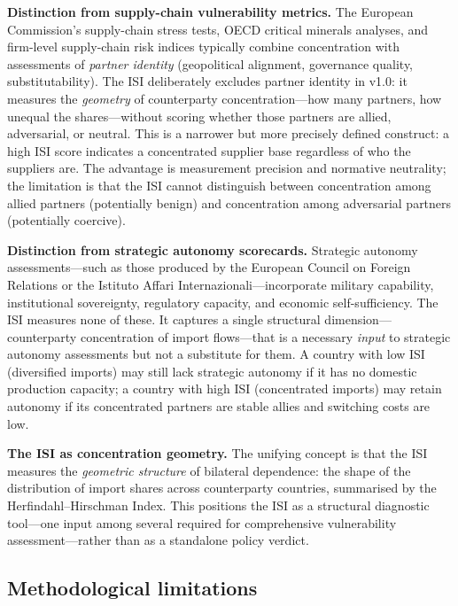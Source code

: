 \textbf{Distinction from supply-chain vulnerability metrics.}  The
European Commission's supply-chain stress tests, OECD critical
minerals analyses, and firm-level supply-chain risk indices typically
combine concentration with assessments of \emph{partner identity}
(geopolitical alignment, governance quality, substitutability).  The
ISI deliberately excludes partner identity in v1.0: it measures the
\emph{geometry} of counterparty concentration---how many partners,
how unequal the shares---without scoring whether those partners are
allied, adversarial, or neutral.  This is a narrower but
more precisely defined construct: a high ISI score indicates a
concentrated supplier base regardless of who the suppliers are.  The
advantage is measurement precision and normative neutrality; the
limitation is that the ISI cannot distinguish between concentration
among allied partners (potentially benign) and concentration among
adversarial partners (potentially coercive).

\textbf{Distinction from strategic autonomy scorecards.}  Strategic
autonomy assessments---such as those produced by the European Council
on Foreign Relations or the Istituto Affari Internazionali---incorporate
military capability, institutional sovereignty, regulatory capacity,
and economic self-sufficiency.  The ISI measures none of these.  It
captures a single structural dimension---counterparty concentration
of import flows---that is a necessary \emph{input} to strategic
autonomy assessments but not a substitute for them.  A country with
low ISI (diversified imports) may still lack strategic autonomy if it
has no domestic production capacity; a country with high ISI
(concentrated imports) may retain autonomy if its concentrated partners
are stable allies and switching costs are low.

\textbf{The ISI as concentration geometry.}  The unifying concept is
that the ISI measures the \emph{geometric structure} of bilateral
dependence: the shape of the distribution of import shares across
counterparty countries, summarised by the Herfindahl--Hirschman Index.
This positions the ISI as a structural diagnostic tool---one input
among several required for comprehensive vulnerability
assessment---rather than as a standalone policy verdict.

\subsection{Methodological limitations}\label{sec:limitations}

